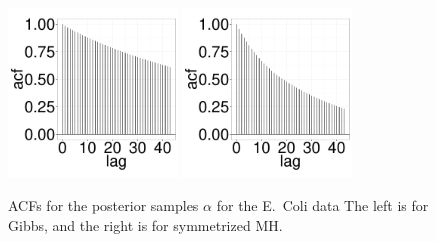{  \begin{figure}[H]
  \centering
  \begin{minipage}[!hp]{0.99\linewidth}
    \includegraphics [width=0.40\textwidth, angle=0]{figs/ecoli_ks/ecoli_alphagbsacf_31_3_0_.pdf}
	\hspace{.5in}
    \includegraphics [width=0.40\textwidth, angle=0]{figs/ecoli_ks/ecoli_alphamhacf_31_3_0_.pdf}
  \end{minipage}

    \caption{ACFs for the posterior samples $\alpha$ for the E.\ Coli data The left is for Gibbs, and the right is for symmetrized MH.}
     \label{fig:ACF_ECOLI}
  \end{figure}

}

